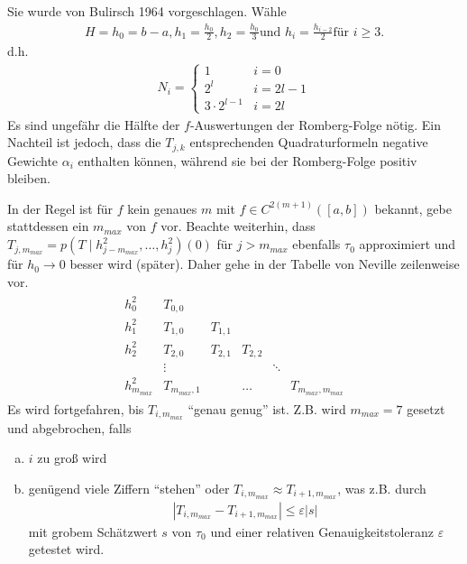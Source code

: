 \label{7.3.6}
Sie wurde von Bulirsch 1964 vorgeschlagen.
Wähle 
\begin{gather}
  H=h_0=b-a, h_1=\frac{h_0}{2},h_2=\frac{h_0}{3}
  \text{und }  h_i=\frac{h_{i-2}}{2} \text{für } i\geq 3.
  \label{VII.3.9}
\end{gather}
d.h. 
\begin{gather*}
  N_i = \begin{cases}1&i=0\\2^l&i=2l-1\\3\cdot2^{l-1}&i=2l\end{cases}
\end{gather*}
\label{im7.3.6}
Es sind ungefähr die Hälfte 
der $f$-Auswertungen der Romberg-Folge nötig.
Ein Nachteil ist jedoch,
dass die $T_{j,k}$ entsprechenden Quadraturformeln
negative Gewichte $\alpha_i$ enthalten können,
während sie bei der Romberg-Folge positiv bleiben.


\label{7.3.7}
In der Regel ist für $f$ kein genaues $m$ mit $f\in C^{2(m+1)}([a,b])$
bekannt,
gebe stattdessen ein $m_{max}$ von $f$ vor.
Beachte weiterhin, dass 
$T_{j,m_{max}}=p(T\mid h_{j-m_{max}}^2,\ldots,h_j^2)(0)$
für $j>m_{max}$ ebenfalls $\tau_0$ approximiert
und für $h_0\longrightarrow 0$ besser wird (später).
Daher gehe in der Tabelle von Neville zeilenweise vor.
\begin{align*}
  \begin{array}{lccccc}
    h_0^2 & T_{0,0}\\
    h_1^2 & T_{1,0} & T_{1,1}\\
    h_2^2 & T_{2,0} & T_{2,1} & T_{2,2} \\
          & \vdots&&&\ddots\\
    h_{m_{max}}^2 & T_{m_{max},1} &&\ldots && T_{m_{max},m_{max}}
  \end{array}
\end{align*}
\label{im7.3.7}
Es wird fortgefahren, bis $T_{i,m_{max}}$ \enquote{genau genug} ist.
Z.B. wird $m_{max}=7$ gesetzt und abgebrochen, falls
\begin{enumerate}[a)]
\item $i$ zu groß wird
\item genügend viele Ziffern \enquote{stehen}
  oder $T_{i,m_{max}}\approx T_{i+1,m_{max}}$,
  was z.B. durch 
  \begin{gather}
    \left| T_{i,m_{max}}-T_{i+1,m_{max}}\right|\leq \varepsilon|s|
    \label{VII.3.20}
  \end{gather}
  mit grobem Schätzwert $s$ von $\tau_0$ und einer relativen
  Genauigkeitstoleranz $\varepsilon$ getestet wird.
\end{enumerate}

